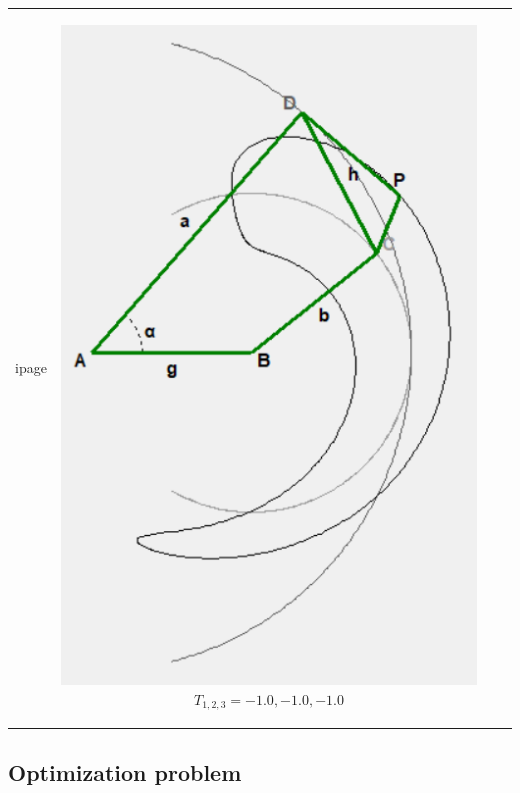 \documentclass[ucs,10pt]{beamer}
\begin{document}
\begin{frame}
\begin{center}
\begin{tabular}{ c@{\hskip 5pt}c@{\hskip 5pt}c@{\hskip 5pt}c}
ipage}& \begin{minipage}{0.23\linewidth}\begin{center} \includegraphics[width=0.5\linewidth]{./Figures/27_motion_cases/-1-1-1.png} \hfill {\tiny $T_{1,2,3} = -1.0, -1.0, -1.0$}\end{center}\end{minipage}\\
	\end{tabular}
\end{center}
\end{frame}

\subsection{Optimization problem}
\end{document}
